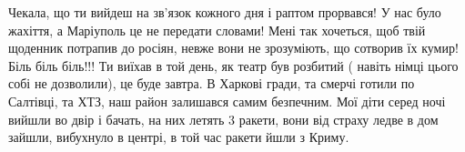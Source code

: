  
 
 
 
 

\qqSecCmt


Чекала, що ти вийдеш на зв'язок кожного дня і раптом прорвався! У нас було
жахіття, а Маріуполь це не передати словами! Мені так хочеться, щоб твій
щоденник потрапив до росіян, невже вони не зрозуміють, що сотворив їх кумир!
Біль біль біль!!! Ти виїхав в той день, як театр був розбитий ( навіть німці
цього собі не дозволили), це буде завтра. В Харкові гради, та смерчі готили по
Салтівці, та ХТЗ, наш район залишався самим безпечним. Мої діти серед ночі
вийшли во двір і бачать, на них летять 3 ракети, вони від страху ледве в дом
зайшли, вибухнуло в центрі, в той час ракети йшли з Криму.

